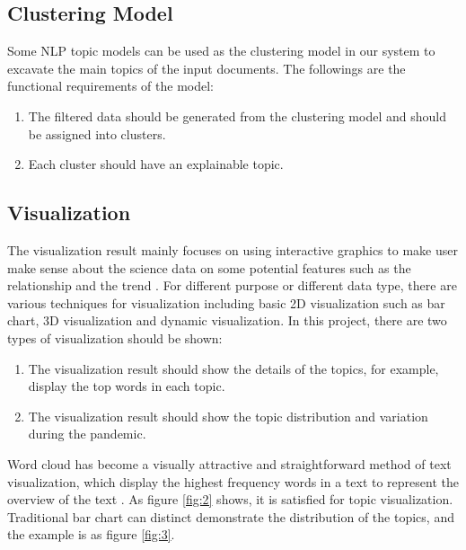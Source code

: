 \subsection{Clustering Model}

Some NLP topic models can be used as the clustering model in our system to excavate the main topics of the input documents. The followings are the functional requirements of the model:

\begin{enumerate}
    \item The filtered data should be generated from the clustering model and should be assigned into clusters.
    \item Each cluster should have an explainable topic.
\end{enumerate}

\subsection{Visualization}
The visualization result mainly focuses on using interactive graphics to make user make sense about the science data on some potential features such as the relationship and the trend \cite{grinstein2002information}. For different purpose or different data type, there are various techniques for visualization including basic 2D visualization such as bar chart, 3D visualization and dynamic visualization. In this project, there are two types of visualization should be shown:

\begin{enumerate}
    \item The visualization result should show the details of the topics, for example, display the top words in each topic.
    \item The visualization result should show the topic distribution and variation during the pandemic.
\end{enumerate}

Word cloud has become a visually attractive and straightforward method of text visualization, which display the highest frequency words in a text to represent the overview of the text \cite{cui2010context}. As figure \ref{fig:2} shows, it is satisfied for topic visualization. Traditional bar chart can distinct demonstrate the distribution of the topics, and the example is as figure \ref{fig:3}.

